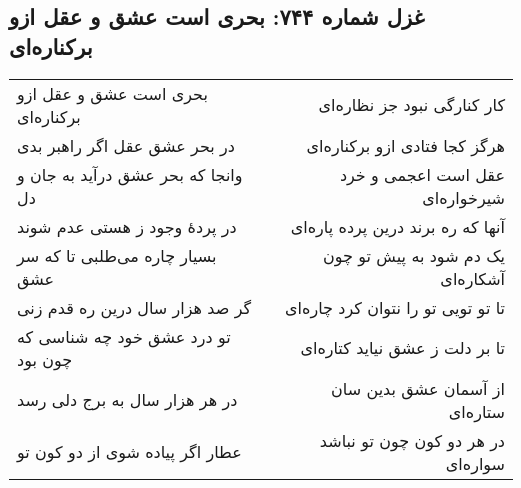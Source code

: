 \begin{center}
\section*{غزل شماره ۷۴۴: بحری است عشق و عقل ازو برکناره‌ای}
\label{sec:744}
\begin{longtable}{l p{0.5cm} r}
بحری است عشق و عقل ازو برکناره‌ای
&&
کار کنارگی نبود جز نظاره‌ای
\\
در بحر عشق عقل اگر راهبر بدی
&&
هرگز کجا فتادی ازو برکناره‌ای
\\
وانجا که بحر عشق درآید به جان و دل
&&
عقل است اعجمی و خرد شیرخواره‌ای
\\
در پردهٔ وجود ز هستی عدم شوند
&&
آنها که ره برند درین پرده پاره‌ای
\\
بسیار چاره می‌طلبی تا که سر عشق
&&
یک دم شود به پیش تو چون آشکاره‌ای
\\
گر صد هزار سال درین ره قدم زنی
&&
تا تو تویی تو را نتوان کرد چاره‌ای
\\
تو درد عشق خود چه شناسی که چون بود
&&
تا بر دلت ز عشق نیاید کتاره‌ای
\\
در هر هزار سال به برج دلی رسد
&&
از آسمان عشق بدین سان ستاره‌ای
\\
عطار اگر پیاده شوی از دو کون تو
&&
در هر دو کون چون تو نباشد سواره‌ای
\\
\end{longtable}
\end{center}
